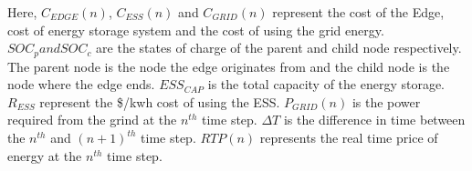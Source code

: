 Here, $C_{EDGE}(n)$, $C_{ESS}(n)$ and $C_{GRID}(n)$ represent the cost of the Edge, cost of energy storage system and the cost of using the grid energy. $SOC_p and SOC_c$ are the states of charge of the parent and child node respectively. The parent node is the node the edge originates from and the child node is the node where the edge ends. $ESS_{CAP}$ is the total capacity of the energy storage. $R_{ESS}$ represent the \$/kwh cost of using the ESS. $P_{GRID}(n)$ is the power required from the grind at the $n^{th}$ time step. $\Delta T$ is the difference in time between the $n^{th}$ and $(n+1)^{th}$ time step. $RTP(n)$ represents the real time price of energy at the $n^{th}$ time step.